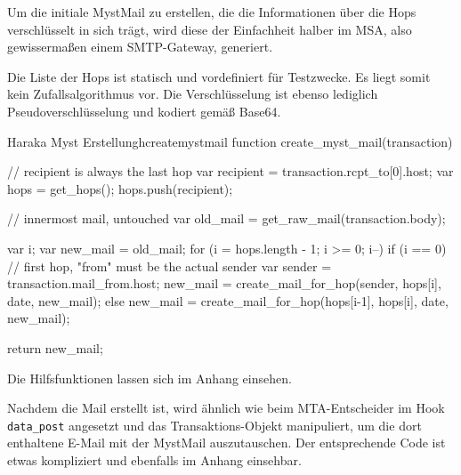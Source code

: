 Um die initiale MystMail zu erstellen, die die Informationen über die Hops verschlüsselt in sich trägt, wird diese der Einfachheit halber im MSA, also gewissermaßen einem SMTP-Gateway, generiert.

Die Liste der Hops ist statisch und vordefiniert für Testzwecke. Es liegt somit kein Zufallsalgorithmus vor. Die Verschlüsselung ist ebenso lediglich Pseudoverschlüsselung und kodiert gemäß Base64.

\begin{minipage}{\linewidth}
\begin{JavaScript}{Haraka Myst Erstellung}{hcreatemystmail}
function create_myst_mail(transaction) {
	// recipient is always the last hop
	var recipient = transaction.rcpt_to[0].host;
	var hops = get_hops();
	hops.push(recipient);

	// innermost mail, untouched
	var old_mail = get_raw_mail(transaction.body);

	var i;
	var new_mail = old_mail;
	for (i = hops.length - 1; i >= 0; i--) {
		if (i == 0) {
			// first hop, "from" must be the actual sender
			var sender = transaction.mail_from.host;
			new_mail = create_mail_for_hop(sender, hops[i],
			             date, new_mail);
		} else {
			new_mail = create_mail_for_hop(hops[i-1],
			             hops[i], date, new_mail);
		}
	}

	return new_mail;
}
\end{JavaScript}
\end{minipage}

Die Hilfsfunktionen lassen sich im Anhang einsehen. %

Nachdem die Mail erstellt ist, wird ähnlich wie beim MTA-Entscheider im Hook \verb#data_post# angesetzt und das Transaktions-Objekt manipuliert, um die dort enthaltene E-Mail mit der MystMail auszutauschen. Der entsprechende Code ist etwas kompliziert und ebenfalls im Anhang einsehbar.
 